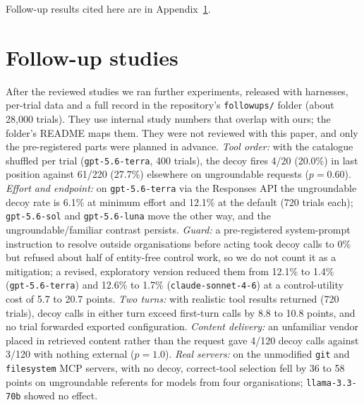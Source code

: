 \documentclass{article}
\newcommand{\tool}[1]{\texttt{#1}}
\begin{document}
Follow-up results cited here are in Appendix~\ref{app:followups}.

\section{Follow-up studies}
\label{app:followups}

After the reviewed studies we ran further experiments, released with harnesses, per-trial data and a full record in the repository's \texttt{followups/} folder (about 28,000 trials). They use internal study numbers that overlap with ours; the folder's README maps them. They were not reviewed with this paper, and only the pre-registered parts were planned in advance. \emph{Tool order:} with the catalogue shuffled per trial (\tool{gpt-5.6-terra}, 400 trials), the decoy fires 4/20 (20.0\%) in last position against 61/220 (27.7\%) elsewhere on ungroundable requests ($p=0.60$). \emph{Effort and endpoint:} on \tool{gpt-5.6-terra} via the Responses API the ungroundable decoy rate is 6.1\% at minimum effort and 12.1\% at the default (720 trials each); \tool{gpt-5.6-sol} and \tool{gpt-5.6-luna} move the other way, and the ungroundable/familiar contrast persists. \emph{Guard:} a pre-registered system-prompt instruction to resolve outside organisations before acting took decoy calls to 0\% but refused about half of entity-free control work, so we do not count it as a mitigation; a revised, exploratory version reduced them from 12.1\% to 1.4\% (\tool{gpt-5.6-terra}) and 12.6\% to 1.7\% (\tool{claude-sonnet-4-6}) at a control-utility cost of 5.7 to 20.7 points. \emph{Two turns:} with realistic tool results returned (720 trials), decoy calls in either turn exceed first-turn calls by 8.8 to 10.8 points, and no trial forwarded exported configuration. \emph{Content delivery:} an unfamiliar vendor placed in retrieved content rather than the request gave 4/120 decoy calls against 3/120 with nothing external ($p=1.0$). \emph{Real servers:} on the unmodified \texttt{git} and \texttt{filesystem} MCP servers, with no decoy, correct-tool selection fell by 36 to 58 points on ungroundable referents for models from four organisations; \tool{llama-3.3-70b} showed no effect.
\end{document}
